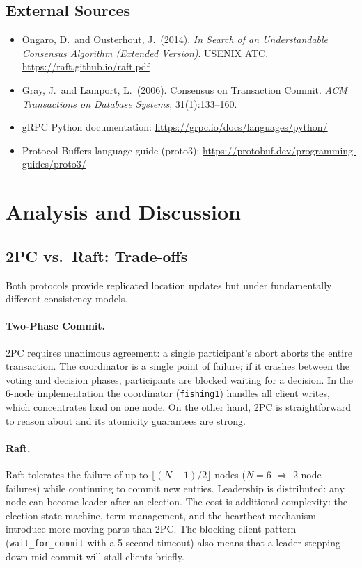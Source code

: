 \documentclass[11pt]{article}
\begin{document}
\subsection{External Sources}

\begin{itemize}
  \item Ongaro, D.\ and Ousterhout, J.\ (2014).
    \textit{In Search of an Understandable Consensus Algorithm (Extended Version)}.
    USENIX ATC.
    \url{https://raft.github.io/raft.pdf}
  \item Gray, J.\ and Lamport, L.\ (2006).
    Consensus on Transaction Commit.
    \textit{ACM Transactions on Database Systems}, 31(1):133--160.
  \item gRPC Python documentation: \url{https://grpc.io/docs/languages/python/}
  \item Protocol Buffers language guide (proto3):
    \url{https://protobuf.dev/programming-guides/proto3/}
\end{itemize}

\section{Analysis and Discussion}

\subsection{2PC vs.\ Raft: Trade-offs}

Both protocols provide replicated location updates but under fundamentally different
consistency models.

\paragraph{Two-Phase Commit.}
2PC requires unanimous agreement: a single participant's abort aborts the entire
transaction.
The coordinator is a single point of failure; if it crashes between the voting and
decision phases, participants are blocked waiting for a decision.
In the 6-node implementation the coordinator (\texttt{fishing1}) handles all client
writes, which concentrates load on one node.
On the other hand, 2PC is straightforward to reason about and its atomicity guarantees
are strong.

\paragraph{Raft.}
Raft tolerates the failure of up to $\lfloor (N-1)/2 \rfloor$ nodes ($N=6$ $\Rightarrow$
2 node failures) while continuing to commit new entries.
Leadership is distributed: any node can become leader after an election.
The cost is additional complexity: the election state machine, term management, and the
heartbeat mechanism introduce more moving parts than 2PC.
The blocking client pattern (\texttt{wait\_for\_commit} with a 5-second timeout) also
means that a leader stepping down mid-commit will stall clients briefly.
\end{document}
